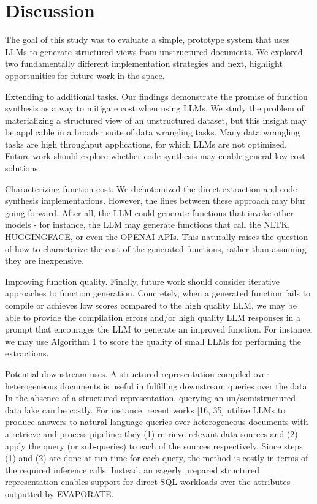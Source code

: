 \documentclass[10pt]{article}
\begin{document}
\section{Discussion}
The goal of this study was to evaluate a simple, prototype system that uses LLMs to generate structured views from unstructured documents. We explored two fundamentally different implementation strategies and next, highlight opportunities for future work in the space.

Extending to additional tasks. Our findings demonstrate the promise of function synthesis as a way to mitigate cost when using LLMs. We study the problem of materializing a structured view of an unstructured dataset, but this insight may be applicable in a broader suite of data wrangling tasks. Many data wrangling tasks are high throughput applications, for which LLMs are not optimized. Future work should explore whether code synthesis may enable general low cost solutions.

Characterizing function cost. We dichotomized the direct extraction and code synthesis implementations. However, the lines between these approach may blur going forward. After all, the LLM could generate functions that invoke other models - for instance, the LLM may generate functions that call the NLTK, HUGGINGFACE, or even the OPENAI APIs. This naturally raises the question of how to characterize the cost of the generated functions, rather than assuming they are inexpensive.

Improving function quality. Finally, future work should consider iterative approaches to function generation. Concretely, when a generated function fails to compile or achieves low scores compared to the high quality LLM, we may be able to provide the compilation errors and/or high quality LLM responses in a prompt that encourages the LLM to generate an improved function. For instance, we may use Algorithm 1 to score the quality of small LLMs for performing the extractions.

Potential downstream uses. A structured representation compiled over heterogeneous documents is useful in fulfilling downstream queries over the data. In the absence of a structured representation, querying an un/semistructured data lake can be costly. For instance, recent works [16, 35] utilize LLMs to produce answers to natural language queries over heterogeneous documents with a retrieve-and-process pipeline: they (1) retrieve relevant data sources and (2) apply the query (or sub-queries) to each of the sources respectively. Since steps (1) and (2) are done at run-time for each query, the method is costly in terms of the required inference calls. Instead, an eagerly prepared structured representation enables support for direct SQL workloads over the attributes outputted by EVAPORATE.
\end{document}
